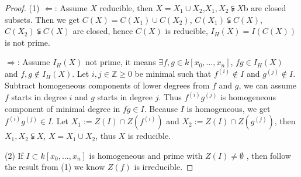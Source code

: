 \documentclass{amsart}
\theoremstyle{plain}
\theoremstyle{definition}
\theoremstyle{remark}
\numberwithin{equation}{section}
\begin{document}
\begin{proof}
	(1) $ \Leftarrow $: Assume $ X $ reducible, then $ X=X_1\cup X_2 $,$ X_1,X_2\subsetneqq X $b are closed subsets. Then we get $ C(X)=C(X_1)\cup C(X_2) $, $ C(X_1)\subsetneqq C(X) $,$ C(X_2)\subsetneqq C(X) $ are closed, hence  $ C(X) $ is reducible, $ I_H(X)=I(C(X)) $ is not prime.
	
	$ \Rightarrow $: Assume $ I_H(X) $ not prime, it means $ \exists f,g\in k[x_0,\dots,x_n] $, $ fg\in I_H(X) $ and $ f,g\not\in I_H(X) $. Let $ i,j\in\mathbb{Z}\geq 0 $ be minimal such that $ f^{(i)}\not\in I $ and $ g^{(j)}\not\in I $. Subtract homogeneous components of lower degrees from $ f $ and $ g $, we can assume $ f $ starts in degree $ i $ and $ g $ starts in degree $ j $. Thus $ f^{(i)}g^{(j)} $  is homogeneous component of minimal degree in $ fg\in I $. Because $ I $ is homogeneous,  we get $ f^{(i)}g^{(j)} \in I$. Let
	$ X_1:=Z(I)\cap Z(f^(i)) $ and $ X_2:=Z(I)\cap Z(g^{(j)}) $, then $ X_1,X_2\subsetneqq X $, $ X=X_1\cup X_2 $, thus $ X $ is reducible.
	
	(2) If $ I\subset k[x_0,\dots,x_n] $ is homogeneous and prime with $ Z(I)\neq\emptyset $ , then follow the result from (1) we know $ Z(f) $ is irreducible.
\end{proof}
  
\end{document}
